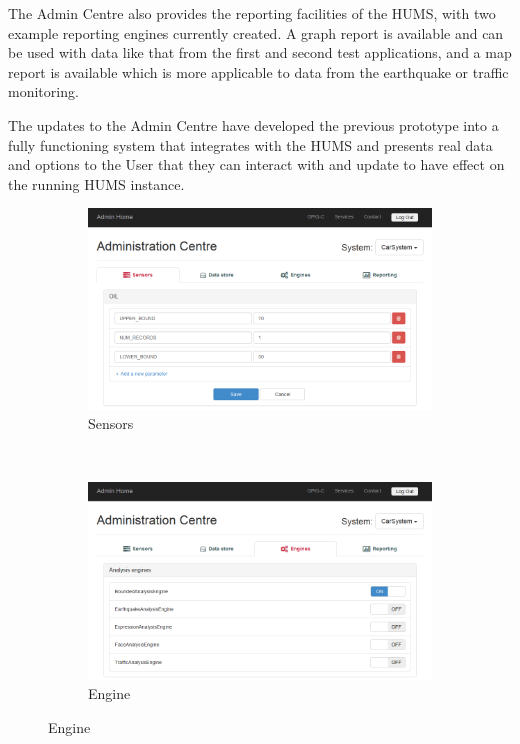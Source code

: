 \documentclass[10pt,a4paper]{article}
\begin{document}
The Admin Centre also provides the reporting facilities of the HUMS, with two example reporting engines currently created. A graph report is available and can be used with data like that from the first and second test applications, and a map report is available which is more applicable to data from the earthquake or traffic monitoring.

The updates to the Admin Centre have developed the previous prototype into a fully functioning system that integrates with the HUMS and presents real data and options to the User that they can interact with and update to have effect on the running HUMS instance.

\begin{figure}[b!]
    \begin{subfigure}{0.49\textwidth}
        \includegraphics[width=\textwidth]{images/admin-centre_sensors.png}
        \caption{Sensors}
        \label{fig:admin-centre_sensors}
    \end{subfigure}
    ~
    \begin{subfigure}{0.49\textwidth}
        \includegraphics[width=\textwidth]{images/admin-centre_engines.png}
        \caption{Engine}
        \label{fig:admin-centre_engines}
    \end{subfigure}
	\vspace{0.2cm}


\end{figure}
\end{document}

